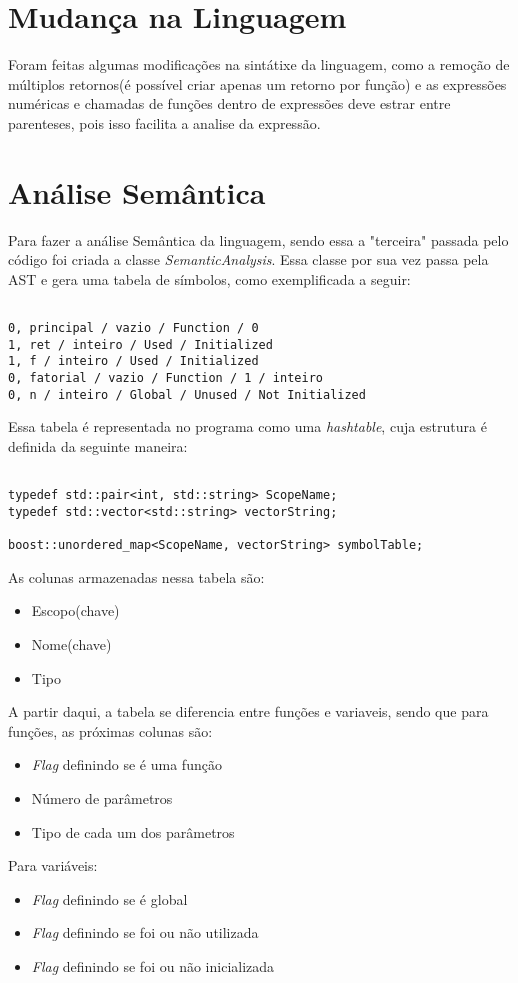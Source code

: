 \documentclass[12pt,a4paper,final]{article}
\begin{document}
\section*{Mudança na Linguagem}

Foram feitas algumas modificações na sintátixe da linguagem, como a remoção de múltiplos retornos(é possível criar apenas um retorno por função) e as expressões numéricas e chamadas de funções dentro de expressões deve estrar entre parenteses, pois isso facilita a analise da expressão.

\section*{Análise Semântica}

Para fazer a análise Semântica da linguagem, sendo essa a "terceira" passada pelo código foi criada a classe \textit{SemanticAnalysis}. Essa classe por sua vez passa pela AST e gera uma tabela de símbolos, como exemplificada a seguir:

\begin{lstlisting}

0, principal / vazio / Function / 0
1, ret / inteiro / Used / Initialized
1, f / inteiro / Used / Initialized
0, fatorial / vazio / Function / 1 / inteiro
0, n / inteiro / Global / Unused / Not Initialized

\end{lstlisting}

Essa tabela é representada no programa como uma \textit{hashtable}, cuja estrutura é definida da seguinte maneira:

\begin{lstlisting}

typedef std::pair<int, std::string> ScopeName;
typedef std::vector<std::string> vectorString;

boost::unordered_map<ScopeName, vectorString> symbolTable;

\end{lstlisting}

As colunas armazenadas nessa tabela são:
\begin{itemize}
\item Escopo(chave)
\item Nome(chave)
\item Tipo
\end{itemize}
A partir daqui, a tabela se diferencia entre funções e variaveis, sendo que para funções, as próximas colunas são:
\begin{itemize}
\item \textit{Flag} definindo se é uma função
\item Número de parâmetros
\item Tipo de cada um dos parâmetros
\end{itemize}
Para variáveis:
\begin{itemize}
\item \textit{Flag} definindo se é global
\item \textit{Flag} definindo se foi ou não utilizada
\item \textit{Flag} definindo se foi ou não inicializada
\end{itemize}
\end{document}

